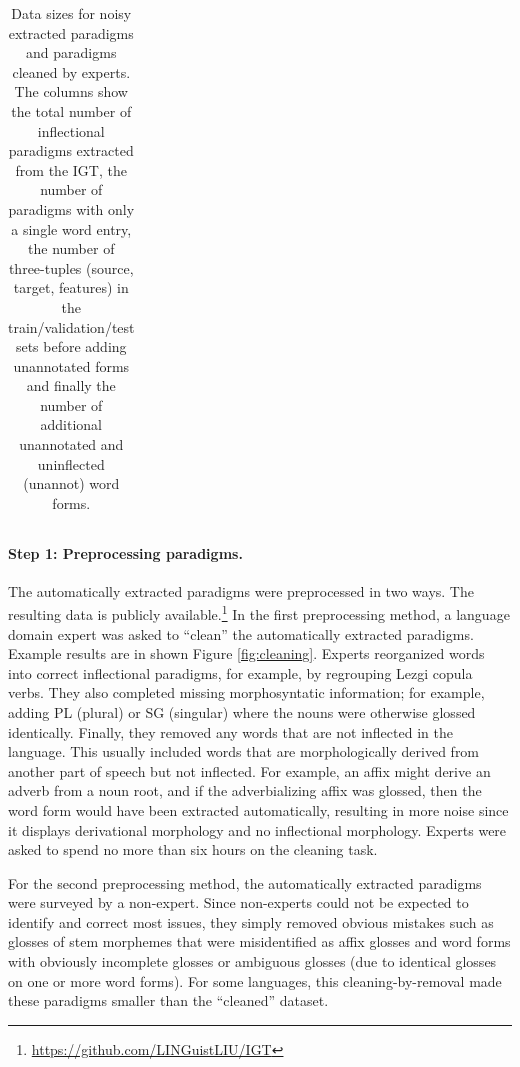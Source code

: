 \begin{table}[]
\begin{tabular}{l|ccccccc}
    \end{tabular}
    \caption[IGT2P data]{Data sizes for noisy extracted paradigms and paradigms cleaned by experts. The columns show the total number of inflectional paradigms extracted from the IGT, the number of paradigms with only a single word entry, the number of three-tuples (source, target, features) in the train/validation/test sets before adding unannotated forms and finally the number of additional unannotated and uninflected (unannot) word forms.}
    \label{tab:IGT2Pdata}
\end{table}


\paragraph{Step 1: Preprocessing paradigms.}
The automatically extracted paradigms were preprocessed in two ways. The resulting data is publicly available.\footnote{\url{https://github.com/LINGuistLIU/IGT}}
In the first preprocessing method, a language domain expert was asked to ``clean'' the automatically extracted paradigms. Example results are in shown Figure \ref{fig:cleaning}. Experts reorganized words into correct inflectional paradigms, for example, by regrouping Lezgi copula verbs. They also completed missing morphosyntatic information; for example, adding PL (plural) or SG (singular) where the nouns were otherwise glossed identically. Finally, they removed any words that are not inflected in the language. This usually included words that are morphologically derived from another part of speech but not inflected. For example, an affix might derive an adverb from a noun root, and if the adverbializing affix was glossed, then the word form would have been extracted automatically, resulting in more noise since it displays derivational morphology and no inflectional morphology. Experts were asked to spend no more than six hours on the cleaning task. 

For the second preprocessing method, the automatically extracted paradigms were surveyed by a non-expert. Since non-experts could not be expected to identify and correct most issues, they simply removed obvious mistakes such as glosses of stem morphemes that were misidentified as affix glosses and word forms with obviously incomplete glosses or ambiguous glosses (due to identical glosses on one or more word forms). For some languages, this cleaning-by-removal made these paradigms smaller than the ``cleaned'' dataset.  

